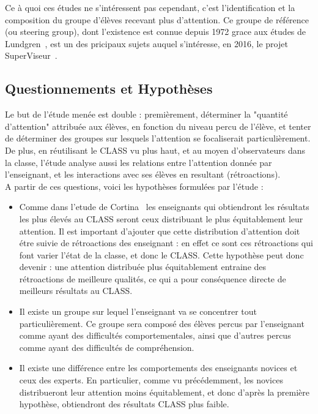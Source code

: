 \documentclass{article}
\begin{document}
Ce à quoi ces études ne s'intéressent pas cependant, c'est l'identification et la composition du groupe d'élèves recevant plus d'attention. Ce groupe de référence (ou steering group), dont l'existence est connue depuis 1972 grace aux études de Lundgren~\cite{Lundgren}, est un des pricipaux sujets auquel s'intéresse, en 2016, le projet SuperViseur~\cite{SuperViseur}.

\subsection{Questionnements et Hypothèses}
Le but de l'étude menée est double : premièrement, déterminer la "quantité d'attention" attribuée aux élèves, en fonction du niveau percu de l'élève, et tenter de déterminer des groupes sur lesquels l'attention se focaliserait particulièrement. De plus, en réutilisant le CLASS vu plus haut, et au moyen d'observateurs dans la classe, l'étude analyse aussi les relations entre l'attention donnée par l'enseignant, et les interactions avec ses élèves en resultant (rétroactions).\\
A partir de ces questions, voici les hypothèses formulées par l'étude :
\begin{itemize}
  \item Comme dans l'etude de Cortina~\cite{Cortina} les enseignants qui obtiendront les résultats les plus élevés au CLASS seront ceux distribuant le plus équitablement leur attention. Il est important d'ajouter que cette distribution d'attention doit étre suivie de rétroactions des enseignant : en effet ce sont ces rétroactions qui font varier l'état de la classe, et donc le CLASS. Cette hypothèse peut donc devenir : une attention distribuée plus équitablement entraine des rétroactions de meilleure qualités, ce qui a pour conséquence directe de meilleurs résultats au CLASS.
  \item Il existe un groupe sur lequel l'enseignant va se concentrer tout particulièrement. Ce groupe sera composé des élèves percus par l'enseignant comme ayant des difficultés comportementales, ainsi que d'autres percus comme ayant des difficultés de compréhension.
  \item Il existe une différence entre les comportements des enseignants novices et ceux des experts. En particulier, comme vu précédemment, les novices distribueront leur attention moins équitablement, et donc d'après la première hypothèse, obtiendront des résultats CLASS plus faible.
\end{itemize}
\end{document}
